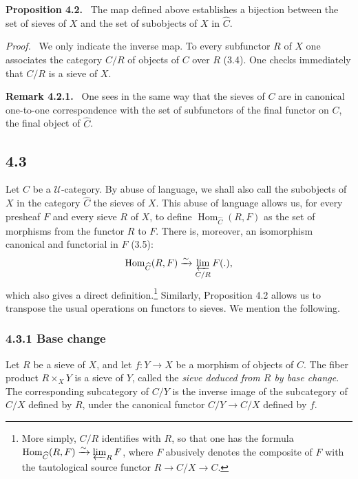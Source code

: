 \documentclass[11pt]{article}
\newcommand{\U}{\mathcal{U}}
\newcommand{\Hom}{\operatorname{Hom}}
\newenvironment{statement}[1]{\par\medskip\noindent\textbf{#1.}\ }{\par\medskip}
\newenvironment{proofsketch}{\par\noindent\emph{Proof.}\ }{\par\medskip}
\begin{document}
\begin{statement}{Proposition 4.2}
The map defined above establishes a bijection between the set of sieves of $X$ and the set of subobjects of $X$ in $\widehat C$.
\end{statement}

\begin{proofsketch}
We only indicate the inverse map. To every subfunctor $R$ of $X$ one associates the category $C/R$ of objects of $C$ over $R$ (3.4). One checks immediately that $C/R$ is a sieve of $X$.
\end{proofsketch}

\begin{statement}{Remark 4.2.1}
One sees in the same way that the sieves of $C$ are in canonical one-to-one correspondence with the set of subfunctors of the final functor on $C$, the final object of $\widehat C$.
\end{statement}

\subsection*{4.3}
Let $C$ be a $\U$-category. By abuse of language, we shall also call the subobjects of $X$ in the category $\widehat C$ the sieves of $X$. This abuse of language allows us, for every presheaf $F$ and every sieve $R$ of $X$, to define $\Hom_{\widehat C}(R,F)$ as the set of morphisms from the functor $R$ to $F$. There is, moreover, an isomorphism canonical and functorial in $F$ (3.5):
\[
\Hom_{\widehat C}(R,F)\xrightarrow{\sim}\varprojlim_{C/R}F(.),
\]
which also gives a direct definition.\footnote{More simply, $C/R$ identifies with $R$, so that one has the formula $\Hom_{\widehat C}(R,F)\xrightarrow{\sim}\varprojlim_R F$, where $F$ abusively denotes the composite of $F$ with the tautological source functor $R\to C/X\to C$.} Similarly, Proposition 4.2 allows us to transpose the usual operations on functors to sieves. We mention the following.

\subsubsection*{4.3.1 Base change}
Let $R$ be a sieve of $X$, and let $f:Y\to X$ be a morphism of objects of $C$. The fiber product $R\times_XY$ is a sieve of $Y$, called the \emph{sieve deduced from $R$ by base change}. The corresponding subcategory of $C/Y$ is the inverse image of the subcategory of $C/X$ defined by $R$, under the canonical functor $C/Y\to C/X$ defined by $f$.
\end{document}
